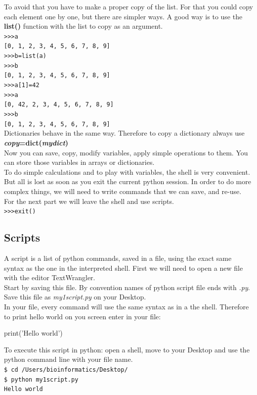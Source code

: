\documentclass[article,10pt]{scrartcl}
\begin{document}
To avoid that you have to make a proper copy of the list. For that you could copy each element one by one, but there are simpler ways. A good way is to use the \textbf{list()} function with the list to copy as an argument.\\
\texttt{>>>a}\\
\texttt{[0, 1, 2, 3, 4, 5, 6, 7, 8, 9]}\\
\texttt{>>>b=list(a)}\\
\texttt{>>>b}\\
\texttt{[0, 1, 2, 3, 4, 5, 6, 7, 8, 9]}\\
\texttt{>>>a[1]=42}\\
\texttt{>>>a}\\
\texttt{[0, 42, 2, 3, 4, 5, 6, 7, 8, 9]}\\
\texttt{>>>b}\\
\texttt{[0, 1, 2, 3, 4, 5, 6, 7, 8, 9]}\\
Dictionaries behave in the same way. Therefore to copy a dictionary always use \textbf{\textit{copy}=dict(\textit{mydict})}\\

Now you can save, copy, modify variables, apply simple operations to them. You can store those variables in arrays or dictionaries.\\
To do simple calculations and to play with variables, the shell is very convenient. But all is lost as soon as you exit the current python session. In order to do more complex things, we will need to write commands that we can save, and re-use.\\
For the next part we will leave the shell and use scripts.\\

\texttt{>>>exit()}\\


\subsection*{Scripts}

A script is a list of python commands, saved in a file, using the exact same syntax as the one in the interpreted shell. First we will need to open a new file with the editor TextWrangler.\\
Start by saving this file. By convention names of python script file ends with \textit{.py}. Save this file as \textit{my1script.py} on your Desktop.\\
In your file, every command will use the same syntax as in a the shell. Therefore to print hello world on you screen enter in your file:
\begin{python}
print('Hello world')
\end{python}
To execute this script in python: open a shell, move to your Desktop and use the python command line with your file name.\\
\texttt{\$ cd /Users/bioinformatics/Desktop/}\\
\texttt{\$ python my1script.py}\\
\texttt{Hello world}\\
\end{document}
